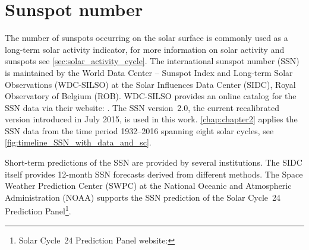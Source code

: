 

\section{Sunspot number}
\label{sec:sunspot_number}
The number of sunspots occurring on the solar surface is commonly used as a long-term solar activity indicator, for more information on solar activity and sunspots see \autoref{sec:solar_activity_cycle}. The international sunspot number (SSN) is maintained by the World Data Center -- Sunspot Index and Long-term Solar Observations (WDC-SILSO) at the Solar Influences Data Center (SIDC), Royal Observatory of Belgium (ROB). WDC-SILSO provides an online catalog for the SSN data via their website: . The SSN version~2.0, the current recalibrated version introduced in July 2015, is used in this work. \autoref{chap:chapter2} applies the SSN data from the time period 1932--2016 spanning eight solar cycles, see \autoref{fig:timeline_SSN_with_data_and_sc}.

Short-term predictions of the SSN are provided by several institutions. The SIDC itself provides 12-month SSN forecasts derived from different methods. The Space Weather Prediction Center (SWPC) at the National Oceanic and Atmospheric Administration (NOAA) supports the SSN prediction of the Solar Cycle~24 Prediction Panel\footnote{Solar Cycle~24 Prediction Panel website: }.


